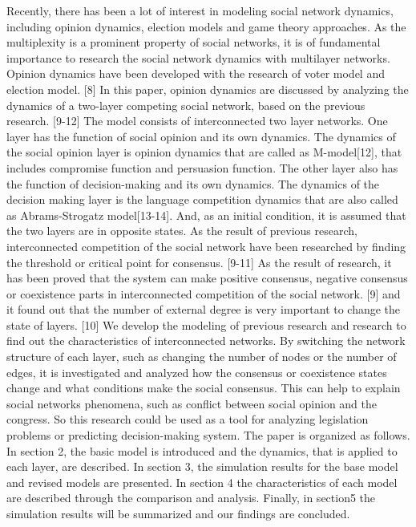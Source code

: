 \documentclass[english]{cccconf}
\begin{document}
Recently, there has been a lot of interest in modeling social network dynamics, including opinion dynamics, election models and game theory approaches. As the multiplexity is a prominent property of social networks, it is of fundamental importance to research the social network dynamics with multilayer networks. Opinion dynamics have been developed with the research of voter model and election model. [8]  
In this paper, opinion dynamics are discussed by analyzing the dynamics of a two-layer competing social network, based on the previous research. [9-12] The model consists of interconnected two layer networks. One layer has the function of social opinion and its own dynamics. The dynamics of the social opinion layer is opinion dynamics that are called as M-model[12], that includes compromise function and persuasion function. The other layer also has the function of decision-making and its own dynamics.  The dynamics of the decision making layer is the language competition dynamics that are also called as Abrams-Strogatz model[13-14]. And, as an initial condition, it is assumed that the two layers are in opposite states. 
As the result of previous research, interconnected competition of the social network have been researched by finding the threshold or critical point for consensus. [9-11] As the result of research, it has been proved that the system can make positive consensus, negative consensus or coexistence parts in interconnected competition of the social network. [9] and it found out that the number of external degree is very important to change the state of layers. [10] We develop the modeling of previous research and research to find out the characteristics of interconnected networks. By switching the network structure of each layer, such as changing the number of nodes or the number of edges, it is investigated and analyzed how the consensus or coexistence states change and what conditions make the social consensus. This can help to explain social networks phenomena, such as conflict between social opinion and the congress. So this research could be used as a tool for analyzing legislation problems or predicting decision-making system. 
The paper is organized as follows. In section 2, the basic model is introduced and the dynamics, that is applied to each layer, are described.  In section 3, the simulation results for the base model and revised models are presented. In section 4 the characteristics of each model are described through the comparison and analysis. Finally, in section5 the simulation results will be summarized and our findings are concluded.
\end{document}
